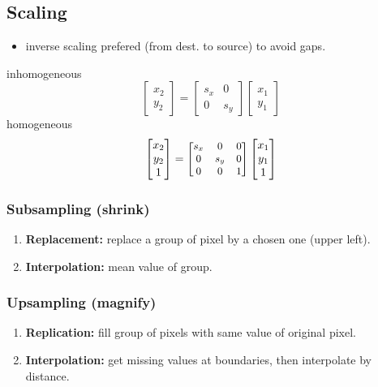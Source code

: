 \subsection{Scaling}
\begin{itemize}
  \item inverse scaling prefered (from dest. to source) to avoid gaps.
\end{itemize}
inhomogeneous
\[\begin{bmatrix}
  x_2\\
  y_2
\end{bmatrix} =
\begin{bmatrix}
  s_x & 0\\
  0 & s_y
\end{bmatrix}
\begin{bmatrix}
  x_1\\
  y_1
\end{bmatrix}\]
homogeneous
\[\begin{bmatrix}
  x_2\\
  y_2\\
  1
\end{bmatrix}=
{\small
\begin{bmatrix}
  s_x & 0 & 0\\
  0 & s_y & 0\\
  0 & 0 & 1
\end{bmatrix}}
\begin{bmatrix}
  x_1\\
  y_1\\
  1
\end{bmatrix}
\]
\subsubsection{Subsampling (shrink)}
\begin{enumerate}
  \item \textbf{Replacement:} replace a group of pixel by a chosen one (upper left).
  \item \textbf{Interpolation:} mean value of group.
\end{enumerate}
\subsubsection{Upsampling (magnify)}
\begin{enumerate}
  \item\textbf{Replication:} fill group of pixels with same value of original pixel.\\
  \item\textbf{Interpolation:} get missing values at boundaries, then interpolate by distance.\\
\end{enumerate}
